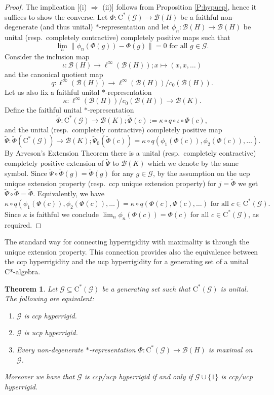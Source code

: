 \documentclass[11pt, draft]{amsart}
\numberwithin{equation}{section}
\theoremstyle{plain}
\newtheorem{theorem}{Theorem}[section]
\theoremstyle{definition}
\theoremstyle{remark}
\newcommand{\B}{{\mathcal{B}}}
\newcommand{\G}{{\mathcal{G}}}
\def\io{\iota}
\def\ka{\kappa}
\newcommand{\foral}{\text{ for all }}
\newcommand{\ca}{\mathrm{C}^*}
\newcommand{\wt}{\widetilde}
\begin{document}
\begin{proof}
The implication [(i) $\Rightarrow$ (ii)] follows from Proposition \ref{P:hypuep}, hence it suffices to show the converse.
Let $\Phi \colon \ca(\G) \to \B(H)$ be a faithful non-degenerate (and thus unital) $*$-representation and let $\phi_n \colon \B(H) \to \B(H)$ be unital (resp.\ completely contractive) completely positive maps such that
\[
\lim_n \|\phi_n(\Phi(g)) - \Phi(g)\| = 0 \foral g \in \G.
\]
Consider the inclusion map
\[
\io \colon \B(H) \to \ell^{\infty}(\B(H)); x \mapsto (x, x, \dots)
\]
and the canonical quotient map
\[
q \colon \ell^{\infty}(\B(H)) \to \ell^\infty(\B(H))/c_0(\B(H)).
\]
Let us also fix a faithful unital $*$-representation
\[
\ka \colon \ell^\infty(\B(H))/c_0(\B(H)) \to \B(K).
\]
Define the faithful unital $*$-representation
\[
\wt{\Phi} \colon \ca(\G) \to \B(K); \wt{\Phi}(c) := \ka \circ q \circ \io \circ \Phi(c),
\]
and the unital (resp.\ completely contractive) completely positive map
\[
\wt{\Psi} \colon \wt{\Phi}(\ca(\G)) \to \B(K); \wt{\Psi}_0(\wt{\Phi}(c)) = \ka \circ q ( \phi_1(\Phi(c)), \phi_2(\Phi(c)), \dots ).
\]
By Arveson's Extension Theorem there is a unital (resp.\ completely contractive) completely positive extension of $\wt{\Psi}$ to $\B(K)$ which we denote by the same symbol. 
Since $\wt{\Psi}\circ \wt{\Phi}(g) = \wt{\Phi}(g)$ for any $g\in\G$, by the assumption on the ucp unique extension property (resp.\ ccp unique extension property) for $j=\wt{\Phi}$ we get $\wt{\Psi}\circ \wt{\Phi} = \wt{\Phi}$.
Equivalently, we have
\[
\ka \circ q(\phi_1(\Phi(c)), \phi_2(\Phi(c)), \dots)
=
\ka \circ q(\Phi(c), \Phi(c), \dots)
\foral 
c \in \ca(\G).
\]
Since $\ka$ is faithful we conclude $\lim_n \phi_n(\Phi(c)) = \Phi(c)$ for all $c \in \ca(\G)$, as required.
\end{proof}

The standard way for connecting hyperrigidity with maximality is through the unique extension property. 
This connection provides also the equivalence between the ccp hyperrigidity and the ucp hyperrigidity for a generating set of a unital C*-algebra.

\begin{theorem}\label{T:hypiffmaxun}
Let $\G \subseteq \ca(\G)$ be a generating set such that $\ca(\G)$ is unital.
The following are equivalent:
\begin{enumerate}
\item $\G$ is ccp hyperrigid.
\item $\G$ is ucp hyperrigid.
\item Every non-degenerate $*$-representation $\Phi \colon \ca(\G) \to \B(H)$ is maximal on $\G$.
\end{enumerate}
Moreover we have that $\G$ is ccp/ucp hyperrigid if and only if $\G \cup \{1\}$ is ccp/ucp hyperrigid.
\end{theorem}
\end{document}
